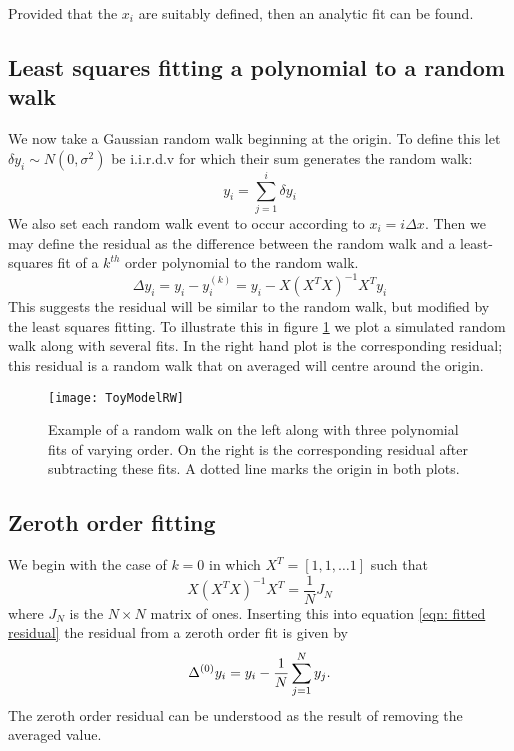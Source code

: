 Provided that the $x_{i}$ are suitably defined, then an analytic fit can be
found.

\subsection{Least squares fitting a polynomial to a random walk}
We now take a Gaussian random walk beginning at the origin. To define this let
$\delta y_{i} \sim N(0, \sigma^{2})$ be i.i.r.d.v for which their sum generates
the random walk:
\begin{equation}
y_{i} = \sum_{j=1}^{i}\delta y_{i}
\label{eqn: ToyModel RW definition}
\end{equation}
We also set each random walk event to occur according to $x_{i} = i \Delta
x$. Then we may define the
residual as the difference between the random walk and a least-squares fit of a
$k^{th}$ order polynomial to the random walk.
\begin{equation}
\Delta y_{i} = y_{i} - y_{i}^{(k)} = y_{i} - X \left(X^{T}X\right)^{-1} X^{T} y_{i}
\label{eqn: fitted residual}
\end{equation}
This suggests the residual will be similar to the random walk, but modified by
the least squares fitting.  To illustrate this in figure \ref{fig: ToyModelRW}
we plot a simulated random walk along with several fits. In the right hand plot
is the corresponding residual; this residual is a random walk that on averaged
will centre around the origin.
\begin{figure}[htb]
\centering
\texttt{[image: ToyModelRW]}
\caption{Example of a random walk on the left along with three polynomial fits
of varying order. On the right is the corresponding residual after subtracting
these fits. A dotted line marks the origin in both plots.}
\label{fig: ToyModelRW}
\end{figure}

\subsection{Zeroth order fitting}

We begin with the case of $k=0$ in which $X^{T} = [1, 1, \dots 1]$ such
that
\begin{equation}
X \left(X^{T}X\right)^{-1} X^{T} = \frac{1}{N} J_{N}
\end{equation}
where $J_{N}$ is the $N\times N$ matrix of ones.  Inserting this into equation
\eqref{eqn: fitted residual} the residual from a zeroth order fit is given by
\begin{equation}
\Delta^{(0)}  y_{i}= y_{i} - \frac{1}{N} \sum_{j=1}^{N}y_{j}.
\end{equation}
The zeroth order residual can be understood as the result of removing the
averaged value.


